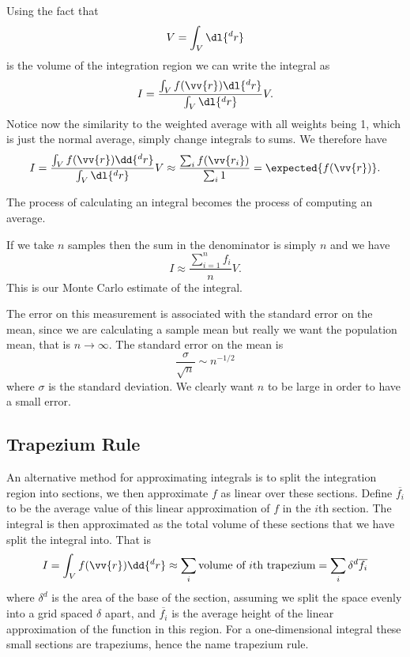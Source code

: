 \documentclass[fleqn]{NotesClass}
\begin{document}
    Using the fact that
    \begin{equation}
        V = \int_V \dl{^dr}
    \end{equation}
    is the volume of the integration region we can write the integral as
    \begin{equation}
        I = \frac{\int_V f(\vv{r}) \dl{^dr}}{\int_V \dl{^dr}} V.
    \end{equation}
    Notice now the similarity to the weighted average with all weights being 1, which is just the normal average, simply change integrals to sums.
    We therefore have
    \begin{equation}
        I = \frac{\int_V f(\vv{r}) \dd{^dr}}{\int_V \dl{^dr}} V \approx \frac{\sum_{i} f(\vv{r_i})}{\sum_i 1} = \expected{f(\vv{r})}.
    \end{equation}
    
    The process of calculating an integral becomes the process of computing an average.
    
    If we take \(n\) samples then the sum in the denominator is simply \(n\) and we have
    \begin{equation}
        I \approx \frac{\sum_{i=1}^{n} f_i}{n}V.
    \end{equation}
    This is our Monte Carlo estimate of the integral.
    
    The error on this measurement is associated with the standard error on the mean, since we are calculating a sample mean but really we want the population mean, that is \(n \to \infty\).
    The standard error on the mean is
    \begin{equation}
        \frac{\sigma}{\sqrt{n}} \sim n^{-1/2}
    \end{equation}
    where \(\sigma\) is the standard deviation.
    We clearly want \(n\) to be large in order to have a small error.
    
    \subsection{Trapezium Rule}
    An alternative method for approximating integrals is to split the integration region into sections, we then approximate \(f\) as linear over these sections.
    Define \(\overline{f_i}\) to be the average value of this linear approximation of \(f\) in the \(i\)th section.
    The integral is then approximated as the total volume of these sections that we have split the integral into.
    That is
    \begin{equation}
        I = \int_V f(\vv{r}) \dd{^d r} \approx \sum_i \text{volume of \(i\)th trapezium} = \sum_i \delta^d \overline{f_i}
    \end{equation}
    where \(\delta^d\) is the area of the base of the section, assuming we split the space evenly into a grid spaced \(\delta\) apart, and \(\overline{f_i}\) is the average height of the linear approximation of the function in this region.
    For a one-dimensional integral these small sections are trapeziums, hence the name trapezium rule.
    
\end{document}
